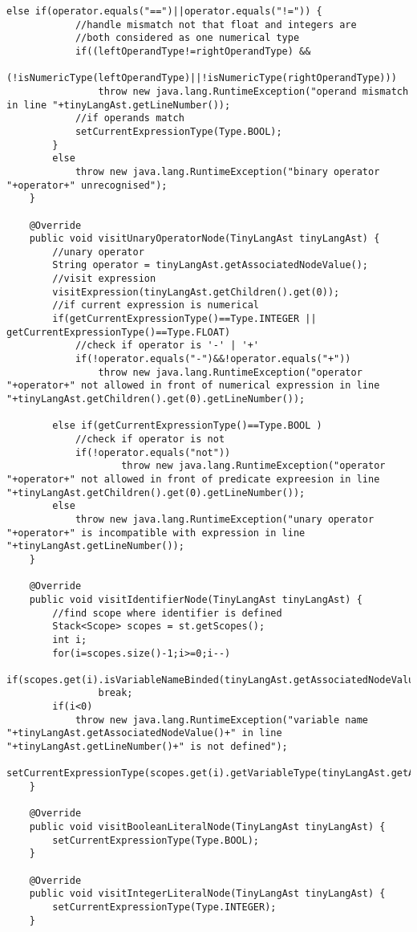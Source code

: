 \begin{lstlisting}[basicstyle=\miniscule,caption=Semantic Analyser,label=listing:semanticanalyser]
		else if(operator.equals("==")||operator.equals("!=")) {
			//handle mismatch not that float and integers are
			//both considered as one numerical type
			if((leftOperandType!=rightOperandType) && 
					(!isNumericType(leftOperandType)||!isNumericType(rightOperandType)))
				throw new java.lang.RuntimeException("operand mismatch in line "+tinyLangAst.getLineNumber());
			//if operands match 
			setCurrentExpressionType(Type.BOOL);
		}
		else 
			throw new java.lang.RuntimeException("binary operator "+operator+" unrecognised");
	}

	@Override
	public void visitUnaryOperatorNode(TinyLangAst tinyLangAst) {
		//unary operator
		String operator = tinyLangAst.getAssociatedNodeValue();
		//visit expression
		visitExpression(tinyLangAst.getChildren().get(0));
		//if current expression is numerical 
		if(getCurrentExpressionType()==Type.INTEGER || getCurrentExpressionType()==Type.FLOAT) 
			//check if operator is '-' | '+'
			if(!operator.equals("-")&&!operator.equals("+")) 
				throw new java.lang.RuntimeException("operator "+operator+" not allowed in front of numerical expression in line "+tinyLangAst.getChildren().get(0).getLineNumber());

		else if(getCurrentExpressionType()==Type.BOOL ) 
			//check if operator is not
			if(!operator.equals("not")) 
					throw new java.lang.RuntimeException("operator "+operator+" not allowed in front of predicate expreesion in line "+tinyLangAst.getChildren().get(0).getLineNumber());
		else 
			throw new java.lang.RuntimeException("unary operator "+operator+" is incompatible with expression in line "+tinyLangAst.getLineNumber());
	}

	@Override
	public void visitIdentifierNode(TinyLangAst tinyLangAst) {
		//find scope where identifier is defined
		Stack<Scope> scopes = st.getScopes();
		int i;
		for(i=scopes.size()-1;i>=0;i--)
			if(scopes.get(i).isVariableNameBinded(tinyLangAst.getAssociatedNodeValue()))
				break;
		if(i<0)
			throw new java.lang.RuntimeException("variable name "+tinyLangAst.getAssociatedNodeValue()+" in line "+tinyLangAst.getLineNumber()+" is not defined");
		setCurrentExpressionType(scopes.get(i).getVariableType(tinyLangAst.getAssociatedNodeValue()));
	}

	@Override
	public void visitBooleanLiteralNode(TinyLangAst tinyLangAst) {
		setCurrentExpressionType(Type.BOOL);
	}

	@Override
	public void visitIntegerLiteralNode(TinyLangAst tinyLangAst) {
		setCurrentExpressionType(Type.INTEGER);
	}


\end{lstlisting}
